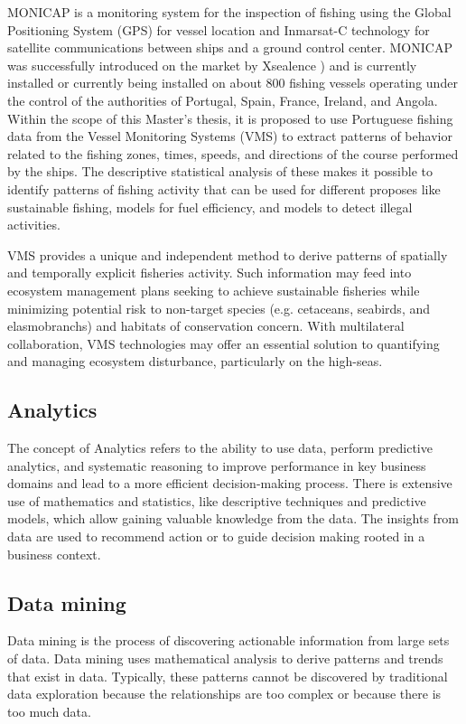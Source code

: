 MONICAP \cite{WEBSITE:MonicapXsealence} is a monitoring system for the inspection of fishing using the Global Positioning System (GPS) for vessel location and Inmarsat-C \cite{WEBSITE:inmarsatC} technology for satellite communications between ships and a ground control center. MONICAP was successfully introduced on the market by Xsealence \cite{WEBSITE:Xsealence}) and is currently installed or currently being installed on about 800 fishing vessels operating under the control of the authorities of Portugal, Spain, France, Ireland, and Angola. Within the scope of this Master's thesis, it is proposed to use Portuguese fishing data from the Vessel Monitoring Systems (VMS) to extract patterns of behavior related to the fishing zones, times, speeds, and directions of the course performed by the ships. The descriptive statistical analysis of these makes it possible to identify patterns of fishing activity that can be used for different proposes like sustainable fishing, models for fuel efficiency, and  models to detect illegal activities.

VMS provides a unique and independent method to derive patterns of spatially and temporally explicit fisheries activity. Such information may feed into ecosystem management plans seeking to achieve sustainable fisheries while minimizing potential risk to non-target species (e.g. cetaceans, seabirds, and elasmobranchs) and habitats of conservation concern. With multilateral collaboration, VMS technologies may offer an essential solution to quantifying and managing ecosystem disturbance, particularly on the high-seas.




\subsection{Analytics} %
\label{sub:analytucs}
The concept of Analytics refers to the ability to use data, perform predictive analytics, and systematic reasoning to improve performance in key business domains and lead to a more efficient decision-making process.
There is extensive use of mathematics and statistics, like descriptive techniques and predictive models, which allow gaining valuable knowledge from the data.
The insights from data are used to recommend action or to guide decision making rooted in a business context.



\subsection{Data mining} %
\label{sub:data_mining}
Data mining is the process of discovering actionable information from large sets of data. Data mining uses mathematical analysis to derive patterns and trends that exist in data. Typically, these patterns cannot be discovered by traditional data exploration because the relationships are too complex or because there is too much data.


